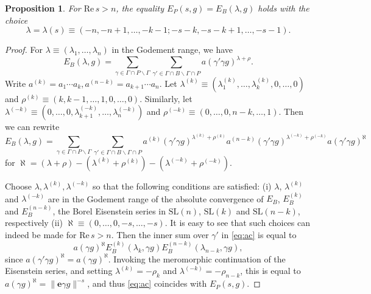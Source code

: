 \documentclass[11pt]{amsart}
\newtheorem{proposition}[theorem]{Proposition}
\numberwithin{theorem}{section}
\numberwithin{equation}{section}
\theoremstyle{remark}
\theoremstyle{definition}
\newcommand{\re}{\mathrm{Re}\,}
\newcommand{\SL}{\mathrm{SL}}
\newcommand{\ve}{\mathbf{e}}
\newcommand{\G}{\Gamma}
\begin{document}
\begin{proposition}\label{prop:epeb}
For $\re s > n$, the equality $E_P(s,g) = E_B(\lambda,g)$ holds with the choice
\begin{equation} \label{eq:lambda}
\lambda = \lambda(s) \equiv (-n, -n+1, \ldots, -k-1; -s-k, -s-k+1, \ldots, -s-1).
\end{equation}
\end{proposition}
\begin{proof}

For $\lambda\equiv(\lambda_1,\ldots,\lambda_n)$ in the Godement range, we have
\[ E_B(\lambda, g) = \sum_{\gamma \in \G \cap P \backslash \G} \sum_{\gamma' \in \G \cap B \backslash \G \cap P} a(\gamma'\gamma g)^{\lambda+\rho}.\]
Write $a^{(k)} = a_1 \cdots a_k, a^{(n-k)} = a_{k+1} \cdots a_n$. Let $\lambda^{(k)} \equiv (\lambda^{(k)}_1,\ldots,\lambda^{(k)}_k,0,\ldots,0)$ and $\rho^{(k)} \equiv (k,k-1,\ldots,1,0,\ldots,0)$. Similarly, let $\lambda^{(-k)} \equiv (0,\ldots,0,\lambda^{(-k)}_{k+1},\ldots,\lambda^{(-k)}_n)$ and $\rho^{(-k)} \equiv (0,\ldots,0,n-k,\ldots,1)$.
Then we can rewrite
\begin{equation} \label{eq:ac}
E_B(\lambda,g) = \sum_{\gamma \in \G \cap P \backslash \G} \sum_{\gamma' \in \G \cap B \backslash \G \cap P} a^{(k)}(\gamma'\gamma g)^{\lambda^{(k)} + \rho^{(k)}} a^{(n-k)}(\gamma' \gamma g)^{\lambda^{(-k)} + \rho^{(-k)}} a(\gamma' \gamma g)^{\aleph}
\end{equation}
for $\aleph = (\lambda + \rho) - (\lambda^{(k)} + \rho^{(k)}) - (\lambda^{(-k)} + \rho^{(-k)})$.

Choose $\lambda, \lambda^{(k)}, \lambda^{(-k)}$ so that the following conditions are satisfied: (i) $\lambda$, $\lambda^{(k)}$ and $\lambda^{(-k)}$ are in the Godement range of the absolute convergence of $E_B$, $E_{B}^{(k)}$ and $E_B^{(n-k)}$, the Borel Eisenstein series in $\SL(n)$, $\SL(k)$ and $\SL(n-k)$, respectively (ii) $\aleph \equiv (0, \ldots, 0, -s, \ldots, -s)$. It is easy to see that such choices can indeed be made for $\re s > n$. Then the inner sum over $\gamma'$ in \eqref{eq:ac} is equal to
\begin{equation*}
a(\gamma g)^\aleph E_{B}^{(k)}(\lambda_k, \gamma g) E_{B}^{(n-k)}(\lambda_{n-k}, \gamma g),
\end{equation*}
since $a(\gamma' \gamma g)^\aleph = a(\gamma g)^\aleph$. Invoking the meromorphic continuation of the Eisenstein series, and setting $\lambda^{(k)} = -\rho_k$ and $\lambda^{(-k)} = -\rho_{n-k}$, this is equal to $a(\gamma g)^\aleph = \|\ve\gamma g\|^{-s}$, and thus \eqref{eq:ac} coincides with $E_P(s,g)$.
\end{proof}
\end{document}
